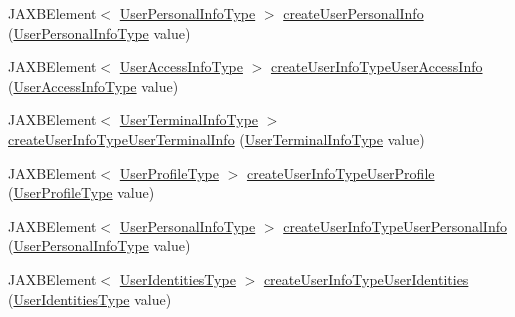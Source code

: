 \begin{DoxyCompactItemize}
\item 
JAXBElement$<$ \hyperlink{classcom_1_1telefonica_1_1schemas_1_1unica_1_1rest_1_1directory_1_1v1_1_1UserPersonalInfoType}{UserPersonalInfoType} $>$ \hyperlink{classcom_1_1telefonica_1_1schemas_1_1unica_1_1rest_1_1directory_1_1v1_1_1ObjectFactory_a38907a29de5465bbfd780f1a2d10bbcd}{createUserPersonalInfo} (\hyperlink{classcom_1_1telefonica_1_1schemas_1_1unica_1_1rest_1_1directory_1_1v1_1_1UserPersonalInfoType}{UserPersonalInfoType} value)
\item 
JAXBElement$<$ \hyperlink{classcom_1_1telefonica_1_1schemas_1_1unica_1_1rest_1_1directory_1_1v1_1_1UserAccessInfoType}{UserAccessInfoType} $>$ \hyperlink{classcom_1_1telefonica_1_1schemas_1_1unica_1_1rest_1_1directory_1_1v1_1_1ObjectFactory_a4edcb13df0f9eeeb98bb5ac62b1cd03f}{createUserInfoTypeUserAccessInfo} (\hyperlink{classcom_1_1telefonica_1_1schemas_1_1unica_1_1rest_1_1directory_1_1v1_1_1UserAccessInfoType}{UserAccessInfoType} value)
\item 
JAXBElement$<$ \hyperlink{classcom_1_1telefonica_1_1schemas_1_1unica_1_1rest_1_1directory_1_1v1_1_1UserTerminalInfoType}{UserTerminalInfoType} $>$ \hyperlink{classcom_1_1telefonica_1_1schemas_1_1unica_1_1rest_1_1directory_1_1v1_1_1ObjectFactory_a4d92edce1a60caf91a69929b7f27f071}{createUserInfoTypeUserTerminalInfo} (\hyperlink{classcom_1_1telefonica_1_1schemas_1_1unica_1_1rest_1_1directory_1_1v1_1_1UserTerminalInfoType}{UserTerminalInfoType} value)
\item 
JAXBElement$<$ \hyperlink{classcom_1_1telefonica_1_1schemas_1_1unica_1_1rest_1_1directory_1_1v1_1_1UserProfileType}{UserProfileType} $>$ \hyperlink{classcom_1_1telefonica_1_1schemas_1_1unica_1_1rest_1_1directory_1_1v1_1_1ObjectFactory_ac3db01133217e9bfaed4162f26ffcd2c}{createUserInfoTypeUserProfile} (\hyperlink{classcom_1_1telefonica_1_1schemas_1_1unica_1_1rest_1_1directory_1_1v1_1_1UserProfileType}{UserProfileType} value)
\item 
JAXBElement$<$ \hyperlink{classcom_1_1telefonica_1_1schemas_1_1unica_1_1rest_1_1directory_1_1v1_1_1UserPersonalInfoType}{UserPersonalInfoType} $>$ \hyperlink{classcom_1_1telefonica_1_1schemas_1_1unica_1_1rest_1_1directory_1_1v1_1_1ObjectFactory_a49629f417f2c5a0fc5f4cab0809f684b}{createUserInfoTypeUserPersonalInfo} (\hyperlink{classcom_1_1telefonica_1_1schemas_1_1unica_1_1rest_1_1directory_1_1v1_1_1UserPersonalInfoType}{UserPersonalInfoType} value)
\item 
JAXBElement$<$ \hyperlink{classcom_1_1telefonica_1_1schemas_1_1unica_1_1rest_1_1directory_1_1v1_1_1UserIdentitiesType}{UserIdentitiesType} $>$ \hyperlink{classcom_1_1telefonica_1_1schemas_1_1unica_1_1rest_1_1directory_1_1v1_1_1ObjectFactory_a56bcce11f4d5c15be12b0cc3def3177c}{createUserInfoTypeUserIdentities} (\hyperlink{classcom_1_1telefonica_1_1schemas_1_1unica_1_1rest_1_1directory_1_1v1_1_1UserIdentitiesType}{UserIdentitiesType} value)

\end{DoxyCompactItemize}
